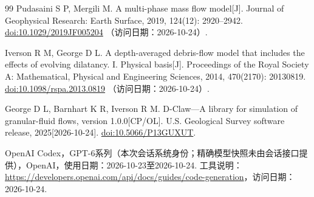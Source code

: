\begin{thebibliography}{99}
Pudasaini S P, Mergili M.
A multi-phase mass flow model[J].
Journal of Geophysical Research: Earth Surface, 2019, 124(12): 2920--2942.
\href{https://doi.org/10.1029/2019JF005204}{doi:10.1029/2019JF005204}
（访问日期：2026-10-24）.

Iverson R M, George D L.
A depth-averaged debris-flow model that includes the effects of evolving dilatancy. I. Physical basis[J].
Proceedings of the Royal Society A: Mathematical, Physical and Engineering Sciences,
2014, 470(2170): 20130819.
\href{https://doi.org/10.1098/rspa.2013.0819}{doi:10.1098/rspa.2013.0819}
（访问日期：2026-10-24）.

George D L, Barnhart K R, Iverson R M.
D-Claw---A library for simulation of granular-fluid flows, version 1.0.0[CP/OL].
U.S. Geological Survey software release, 2025[2026-10-24].
\href{https://doi.org/10.5066/P13GUXUT}{doi:10.5066/P13GUXUT}.

 OpenAI Codex，GPT-6系列（本次会话系统身份；精确模型快照未由会话接口提供），OpenAI，使用日期：2026-10-23至2026-10-24. 工具说明：\url{https://developers.openai.com/api/docs/guides/code-generation}，访问日期：2026-10-24.
\end{thebibliography}
